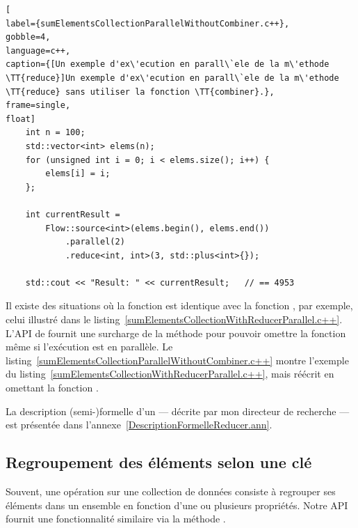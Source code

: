 \begin{lstlisting}[
label={sumElementsCollectionParallelWithoutCombiner.c++},
gobble=4,
language=c++,
caption={[Un exemple d'ex\'ecution en parall\`ele de la m\'ethode \TT{reduce}]Un exemple d'ex\'ecution en parall\`ele de la m\'ethode \TT{reduce} sans utiliser la fonction \TT{combiner}.},
frame=single,
float]
    int n = 100;
    std::vector<int> elems(n);
    for (unsigned int i = 0; i < elems.size(); i++) {
        elems[i] = i;
    };

	int currentResult =
		Flow::source<int>(elems.begin(), elems.end())
            .parallel(2)
            .reduce<int, int>(3, std::plus<int>{}); 
	
	std::cout << "Result: " << currentResult;	// == 4953
\end{lstlisting}



Il existe des situations o\`u la fonction  est identique avec la fonction , par exemple, celui illustr\'e dans le listing~\ref{sumElementsCollectionWithReducerParallel.c++}. L'API de  fournit une surcharge de la m\'ethode  pour pouvoir omettre la fonction  m\^eme si l'ex\'ecution est en parall\`ele. Le listing~\ref{sumElementsCollectionParallelWithoutCombiner.c++} montre l'exemple du listing~\ref{sumElementsCollectionWithReducerParallel.c++}, mais r\'e\'ecrit en omettant la fonction . 




La description (semi-)formelle d'un  --- d\'ecrite par mon directeur de recherche --- est pr\'esent\'ee dans l'annexe~\ref{DescriptionFormelleReducer.ann}.



\subsection{Regroupement des \'el\'ements selon une cl\'e}

Souvent, une op\'eration sur une collection de donn\'ees consiste \`a regrouper ses \'el\'ements dans un ensemble en fonction d'une ou plusieurs propri\'et\'es. Notre {API} fournit une fonctionnalit\'e similaire via la m\'ethode .


